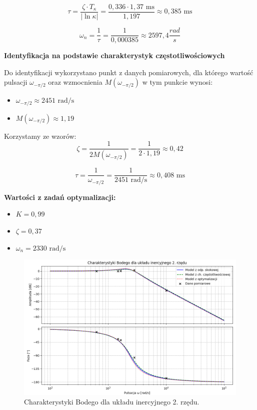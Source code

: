 \documentclass[12pt,a4paper]{article}
\begin{document}
	\begin{equation}
		\tau = \frac{\zeta \cdot T_{\kappa}}{|\ln \kappa|}
		= \frac{0,336 \cdot 1,37 \text{ ms}}{1,197}
		\approx 0,385 \text{ ms}
	\end{equation}
	
	\begin{equation}
		\omega_n = \frac{1}{\tau} = \frac{1}{0,000385} \approx 2 597,4 \frac{rad}{s}
	\end{equation}
	
	\textbf{ Identyfikacja na podstawie charakterystyk częstotliwościowych}
	
	Do identyfikacji wykorzystano punkt z danych pomiarowych, dla którego wartość pulsacji $\omega_{-\pi/2}$ oraz wzmocnienia $M(\omega_{-\pi/2})$ w tym punkcie wynosi:
	\begin{itemize}
		\item $\omega_{-\pi/2} \approx 2451 \text{ rad/s}$
		\item $M(\omega_{-\pi/2}) \approx 1,19$
	\end{itemize}
	
	Korzystamy ze wzorów:
	\begin{equation}
		\zeta = \frac{1}{2 M(\omega_{-\pi/2})}
		= \frac{1}{2 \cdot 1,19}
		\approx 0,42
	\end{equation}
	
	\begin{equation}
		\tau = \frac{1}{\omega_{-\pi/2}}
		= \frac{1}{2451 \text{ rad/s}}
		\approx 0,408 \text{ ms}
	\end{equation}
	
	\textbf{Wartości z zadań optymalizacji:}
	\begin{itemize}
		\item $K = 0,99$
		\item $\zeta = 0,37$
		\item $\omega_n = 2330 \text{ rad/s}$
	\end{itemize}
	
	\begin{figure}[H]
		\centering
		\includegraphics[width=1\linewidth]{zdjecia/bode2rzad.png}
		\caption{Charakterystyki Bodego dla układu inercyjnego 2. rzędu.}
		\label{fig:Body2}
	\end{figure}
	
\end{document}
